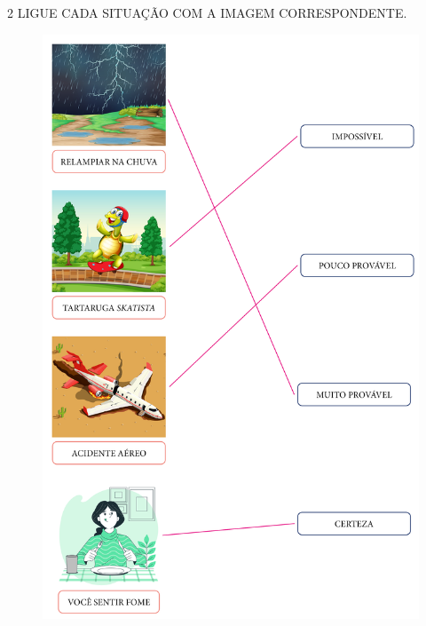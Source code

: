 

\pagebreak

\num{2} LIGUE CADA SITUAÇÃO COM A IMAGEM CORRESPONDENTE.


\begin{figure}[H]
\centering
\includegraphics[width=.9\textwidth]{./media/SAEB_1ANO_MAT_FIGURA86.png}
\end{figure}

